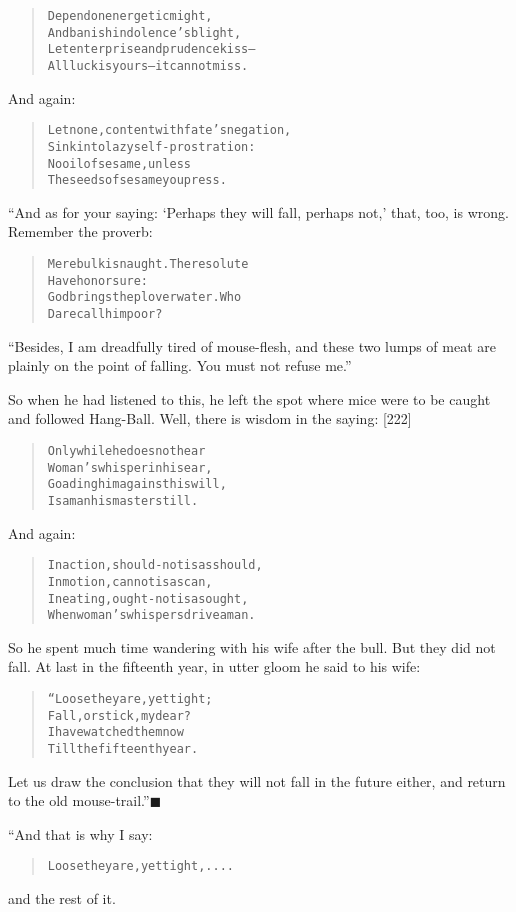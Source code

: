 \documentclass[article, twoside, 14pt]{memoir}
\newcommand{\qed}{\hfill \ensuremath{\blacksquare}}
\renewenvironment{verbatim}{%
\begin{quote}%
\vskip -10pt%
\begin{alltt}\normalfont\large}{\end{alltt}%
\end{quote}%
\vskip -10pt
} %
\begin{document}
\begin{verbatim}
Depend on energetic might,
And banish indolence's blight,
Let enterprise and prudence kiss--
All luck is yours--it cannot miss.
\end{verbatim}
And again:

\begin{verbatim}
Let none, content with fate's negation,
Sink into lazy self-prostration:
No oil of sesame, unless
The seeds of sesame you press.
\end{verbatim}
“And as for your saying: `Perhaps they will fall, perhaps not,'
that, too, is wrong. Remember the proverb:

\begin{verbatim}
Mere bulk is naught. The resolute
    Have honor sure:
God brings the plover water. Who
    Dare call him poor?
\end{verbatim}
``Besides, I am dreadfully tired of mouse-flesh, and these two lumps of meat are plainly on the point of falling. You must not refuse me.''

So when he had listened to this, he left the spot where mice were
to be caught and followed Hang-Ball. Well, there is wisdom in the
saying: [222]

\begin{verbatim}
Only while he does not hear
Woman's whisper in his ear,
Goading him against his will,
Is a man his master still.
\end{verbatim}
And again:

\begin{verbatim}
In action, should-not is as should,
    In motion, cannot is as can,
In eating, ought-not is as ought,
    When woman's whispers drive a man.
\end{verbatim}
So he spent much time wandering with his wife after the bull. But
they did not fall. At last in the fifteenth year, in utter gloom he
said to his wife:

\begin{verbatim}
“Loose they are, yet tight;
    Fall, or stick, my dear?
I have watched them now
    Till the fifteenth year.
\end{verbatim}
Let us draw the conclusion that they will not fall in the future
either, and return to the old mouse-trail.”\hyperref[s43]{\qed}

“And that is why I say:

\begin{verbatim}
Loose they are, yet tight, ....
\end{verbatim}
and the rest of it.
\end{document}
